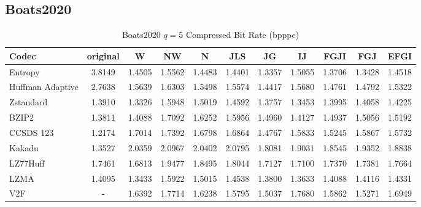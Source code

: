 \documentclass{article}
\begin{document}
\subsection{Boats2020}
\begin{table}[h!]
\centering
\caption{Boats2020 $q=5$ Compressed Bit Rate (bpppc)}
\begin{tabular}{|l|cccccccccc|}
\hline
Codec &  original &      W &     NW &      N &    JLS &     JG &     IJ &   FGJI &    FGJ &   EFGI \\
\hline
Entropy & 3.8149 & 1.4505 & 1.5562 & 1.4483 & 1.4401 & 1.3357 & 1.5055 & 1.3706 & 1.3428 & 1.4518 \\
\hline
Huffman Adaptive &    2.7638 & 1.5639 & 1.6303 & 1.5498 & 1.5574 & 1.4417 & 1.5680 & 1.4761 & 1.4792 & 1.5322 \\
Zstandard        &    1.3910 & 1.3326 & 1.5948 & 1.5019 & 1.4592 & 1.3757 & 1.3453 & 1.3995 & 1.4058 & 1.4225 \\
BZIP2            &    1.3811 & 1.4088 & 1.7092 & 1.6252 & 1.5956 & 1.4960 & 1.4127 & 1.4937 & 1.5056 & 1.5192 \\
CCSDS 123        &    1.2174 & 1.7014 & 1.7392 & 1.6798 & 1.6864 & 1.4767 & 1.5833 & 1.5245 & 1.5867 & 1.5732 \\
Kakadu           &    1.3527 & 2.0359 & 2.0967 & 2.0402 & 2.0795 & 1.8081 & 1.9031 & 1.8545 & 1.9352 & 1.8838 \\
LZ77Huff         &    1.7461 & 1.6813 & 1.9477 & 1.8495 & 1.8044 & 1.7127 & 1.7100 & 1.7370 & 1.7381 & 1.7664 \\
LZMA             &    1.4095 & 1.3433 & 1.5922 & 1.5015 & 1.4538 & 1.3800 & 1.3633 & 1.4088 & 1.4116 & 1.4331 \\
V2F              &   - & 1.6392 & 1.7714 & 1.6238 & 1.5795 & 1.5037 & 1.7680 & 1.5862 & 1.5271 & 1.6949 \\
\hline
\end{tabular}
\end{table}
\end{document}
